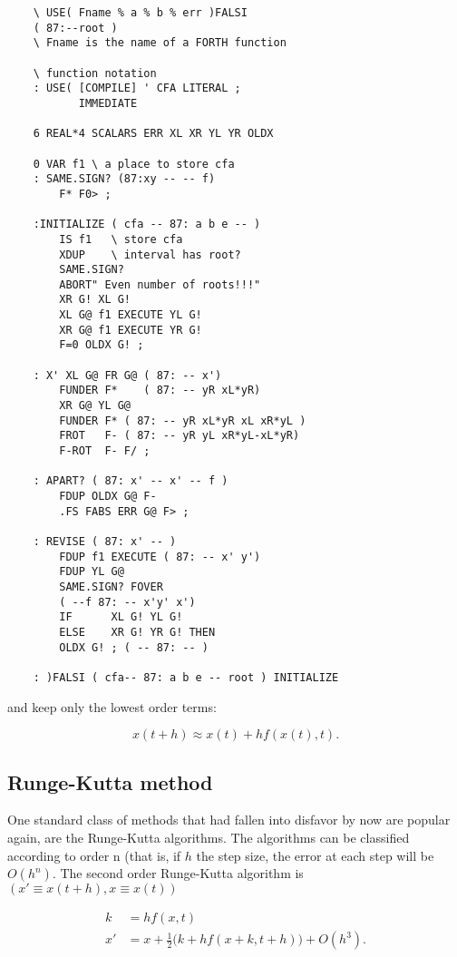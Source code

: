 \begin{lstlisting}
    \ USE( Fname % a % b % err )FALSI
    ( 87:--root )
    \ Fname is the name of a FORTH function

    \ function notation
    : USE( [COMPILE] ' CFA LITERAL ;
           IMMEDIATE

    6 REAL*4 SCALARS ERR XL XR YL YR OLDX

    0 VAR f1 \ a place to store cfa
    : SAME.SIGN? (87:xy -- -- f)
        F* F0> ;

    :INITIALIZE ( cfa -- 87: a b e -- )
        IS f1   \ store cfa
        XDUP    \ interval has root?
        SAME.SIGN?
        ABORT" Even number of roots!!!"
        XR G! XL G!
        XL G@ f1 EXECUTE YL G!
        XR G@ f1 EXECUTE YR G!
        F=0 OLDX G! ;

    : X' XL G@ FR G@ ( 87: -- x')
        FUNDER F*    ( 87: -- yR xL*yR)
        XR G@ YL G@
        FUNDER F* ( 87: -- yR xL*yR xL xR*yL )
        FROT   F- ( 87: -- yR yL xR*yL-xL*yR)
        F-ROT  F- F/ ;

    : APART? ( 87: x' -- x' -- f )
        FDUP OLDX G@ F-
        .FS FABS ERR G@ F> ;

    : REVISE ( 87: x' -- )
        FDUP f1 EXECUTE ( 87: -- x' y')
        FDUP YL G@
        SAME.SIGN? FOVER
        ( --f 87: -- x'y' x')
        IF      XL G! YL G!
        ELSE    XR G! YR G! THEN
        OLDX G! ; ( -- 87: -- )

    : )FALSI ( cfa-- 87: a b e -- root ) INITIALIZE
\end{lstlisting}

and keep only the lowest order terms:

\begin{equation}
x(t+h) \approx x(t) + hf(x(t), t).
    \label{eq:06_18} 
\end{equation}

\subsection{Runge-Kutta method}

One standard class of methods that had fallen into disfavor by now are popular again, are the Runge-Kutta algorithms. The algorithms can be classified according to order n (that is, if $h$ the step size, the error at each step will be $O(h^n)$. The second order Runge-Kutta algorithm is $(x' \equiv x(t+h) , x \equiv x(t) )$

\begin{equation}
\begin{aligned}
    k &= hf(x,t) \\
    x' &= x + \frac{1}{2}\big(k + hf(x+k, t+h)\big) + O(h^3).
    \label{eq:06_19} 
\end{aligned}
\end{equation}

